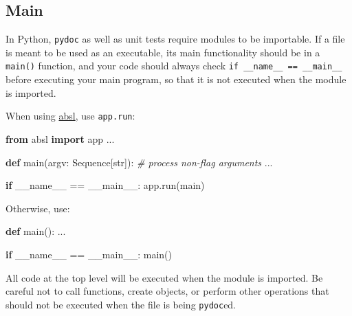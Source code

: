 \documentclass[
]{article}
\newenvironment{Shaded}{}{}
\newcommand{\BuiltInTok}[1]{\textcolor[rgb]{0.00,0.50,0.00}{#1}}
\newcommand{\CommentTok}[1]{\textcolor[rgb]{0.38,0.63,0.69}{\textit{#1}}}
\newcommand{\ControlFlowTok}[1]{\textcolor[rgb]{0.00,0.44,0.13}{\textbf{#1}}}
\newcommand{\ImportTok}[1]{\textcolor[rgb]{0.00,0.50,0.00}{\textbf{#1}}}
\newcommand{\KeywordTok}[1]{\textcolor[rgb]{0.00,0.44,0.13}{\textbf{#1}}}
\newcommand{\NormalTok}[1]{#1}
\newcommand{\OperatorTok}[1]{\textcolor[rgb]{0.40,0.40,0.40}{#1}}
\newcommand{\StringTok}[1]{\textcolor[rgb]{0.25,0.44,0.63}{#1}}
\newcommand{\VariableTok}[1]{\textcolor[rgb]{0.10,0.09,0.49}{#1}}
\begin{document}
\subsection{Main}

In Python, \texttt{pydoc} as well as unit tests require modules to be
importable. If a file is meant to be used as an executable, its main
functionality should be in a \texttt{main()} function, and your code
should always check
\texttt{if\ \_\_name\_\_\ ==\ \textquotesingle{}\_\_main\_\_\textquotesingle{}}
before executing your main program, so that it is not executed when the
module is imported.

When using \href{https://github.com/abseil/abseil-py}{absl}, use
\texttt{app.run}:

\begin{samepage}
\begin{Shaded}
\begin{Highlighting}[]
\ImportTok{from}\NormalTok{ absl }\ImportTok{import}\NormalTok{ app}
\NormalTok{...}

\KeywordTok{def}\NormalTok{ main(argv: Sequence[}\BuiltInTok{str}\NormalTok{]):}
    \CommentTok{\# process non{-}flag arguments}
\NormalTok{    ...}

\ControlFlowTok{if} \VariableTok{\_\_name\_\_} \OperatorTok{==} \StringTok{\textquotesingle{}\_\_main\_\_\textquotesingle{}}\NormalTok{:}
\NormalTok{    app.run(main)}
\end{Highlighting}
\end{Shaded}
\end{samepage}

Otherwise, use:

\begin{samepage}
\begin{Shaded}
\begin{Highlighting}[]
\KeywordTok{def}\NormalTok{ main():}
\NormalTok{    ...}

\ControlFlowTok{if} \VariableTok{\_\_name\_\_} \OperatorTok{==} \StringTok{\textquotesingle{}\_\_main\_\_\textquotesingle{}}\NormalTok{:}
\NormalTok{    main()}
\end{Highlighting}
\end{Shaded}
\end{samepage}

All code at the top level will be executed when the module is imported.
Be careful not to call functions, create objects, or perform other
operations that should not be executed when the file is being
\texttt{pydoc}ed.
\end{document}
